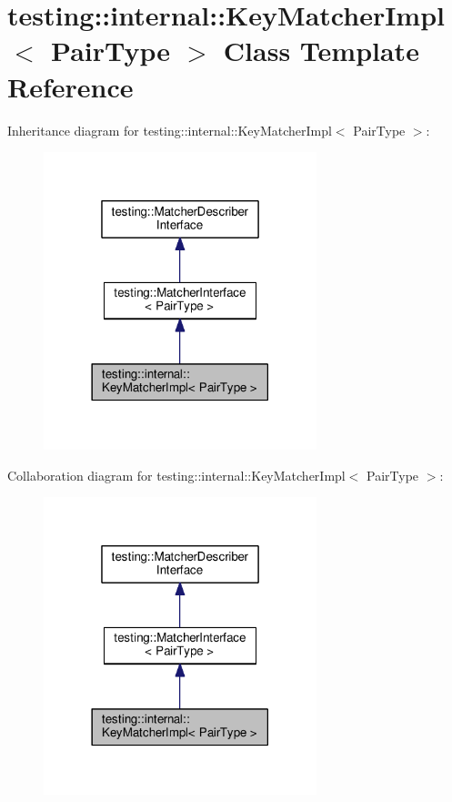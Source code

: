 \hypertarget{classtesting_1_1internal_1_1_key_matcher_impl}{}\section{testing\+:\+:internal\+:\+:Key\+Matcher\+Impl$<$ Pair\+Type $>$ Class Template Reference}
\label{classtesting_1_1internal_1_1_key_matcher_impl}


Inheritance diagram for testing\+:\+:internal\+:\+:Key\+Matcher\+Impl$<$ Pair\+Type $>$\+:
\nopagebreak
\begin{figure}[H]
\begin{center}
\leavevmode
\includegraphics[width=225pt]{classtesting_1_1internal_1_1_key_matcher_impl__inherit__graph}
\end{center}
\end{figure}


Collaboration diagram for testing\+:\+:internal\+:\+:Key\+Matcher\+Impl$<$ Pair\+Type $>$\+:
\nopagebreak
\begin{figure}[H]
\begin{center}
\leavevmode
\includegraphics[width=225pt]{classtesting_1_1internal_1_1_key_matcher_impl__coll__graph}
\end{center}
\end{figure}
